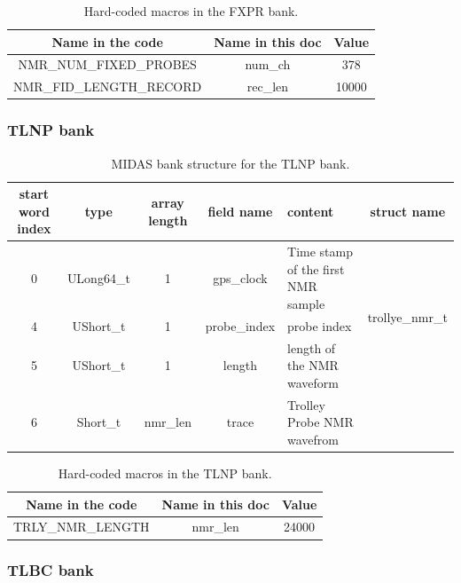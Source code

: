 \begin{table}[htbp]
\centering
\caption{Hard-coded macros in the FXPR bank.}
\begin{tabular}{|c|c|c|}
\hline
Name in the code	& Name in this doc &	Value \\
\hline
NMR\_NUM\_FIXED\_PROBES & num\_ch & 378 \\
\hline
NMR\_FID\_LENGTH\_RECORD & rec\_len & 10000 \\
\hline
\end{tabular} 
\label{tab:fxprmacro}
\end{table}


\subsubsection*{TLNP bank}

\begin{table}[htbp]
\centering
\caption{MIDAS bank structure for the TLNP bank.}
\begin{tabular}{|c|c|c|c|p{4cm}|c|}
\hline
start word index &	type	& array length	&field name	&content	& struct name \\
\hline
0	& ULong64\_t & 1 & gps\_clock & Time stamp of the first NMR sample	& \multirow{3}{*}{trollye\_nmr\_t}   \\ 
\cline{1-5}
4	&UShort\_t	& 1 & probe\_index	&probe index	 & \\ 
\cline{1-5}
5	&UShort\_t	&1 & length&	length of the NMR waveform	 & \\ 
\hline
6	&Short\_t & nmr\_len &	trace	&Trolley Probe NMR wavefrom	 & \\ 
\hline
\end{tabular} 
\label{tab:tlnp}
\end{table}

\begin{table}[htbp]
\centering
\caption{Hard-coded macros in the TLNP bank.}
\begin{tabular}{|c|c|c|}
\hline
Name in the code	& Name in this doc &	Value \\
\hline
TRLY\_NMR\_LENGTH	 & nmr\_len & 24000 \\
\hline
\end{tabular} 
\label{tab:tlnpmacro}
\end{table}


\subsubsection*{TLBC bank}

